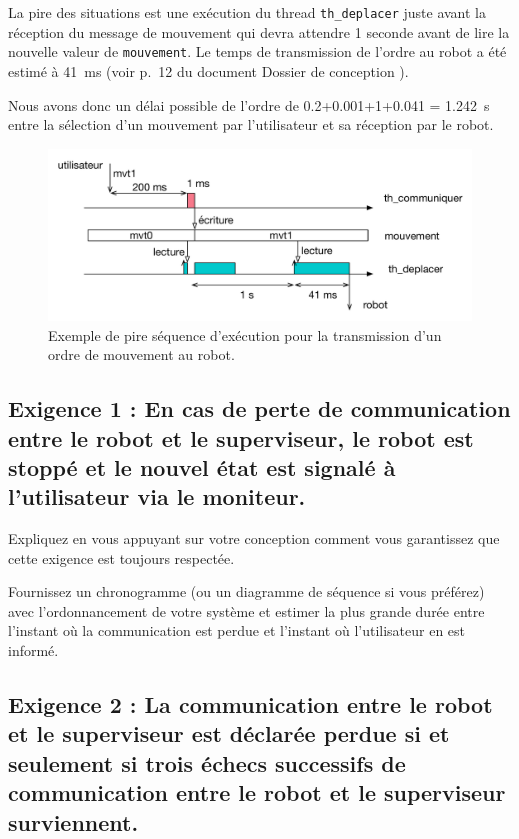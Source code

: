 \documentclass[11pt, a4paper]{paper}
\begin{document}
{La pire des situations est une exécution du thread {\tt th\_deplacer} juste avant la réception du message de mouvement qui devra attendre 1 seconde avant de lire la nouvelle valeur de {\tt mouvement}. Le temps de transmission de l'ordre au robot a été estimé à 41~ms (voir p.~12 du document \og Dossier de conception \fg).

Nous avons donc un délai possible de l'ordre de 0.2+0.001+1+0.041 = 1.242~s entre la sélection d'un mouvement par l'utilisateur et sa réception par le robot.

\begin{figure}[htbp]
\begin{center}
\includegraphics[scale=0.6]{./figures-pdf/sequence}
\caption{\color{red}Exemple de pire séquence d'exécution pour la transmission d'un ordre de mouvement au robot.}
\label{fig:seq}
\end{center}
\end{figure}
}

\subsection{Exigence 1 : En cas de perte de communication entre le robot et le superviseur, le robot est stoppé et le nouvel état est signalé à l'utilisateur via le moniteur.}

{\color{blue} Expliquez en vous appuyant sur votre conception comment vous garantissez que cette exigence est toujours respectée.}

{\color{blue} Fournissez un chronogramme (ou un diagramme de séquence si vous préférez) avec l’ordonnancement de votre système et estimer la plus grande durée entre l'instant où la communication est perdue et l'instant où l'utilisateur en est informé.}

\subsection{Exigence 2 : La communication entre le robot et le superviseur est déclarée perdue si et seulement si trois échecs successifs de communication entre le robot et le superviseur surviennent.}
\end{document}
